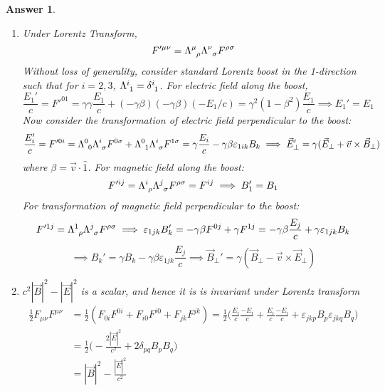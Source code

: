 \documentclass[a4paper]{article}
\theoremstyle{new2}
\newtheorem{ans}{Answer}[section]
\theoremstyle{new}
\begin{document}
\begin{ans}
\begin{enumerate}[label=(\alph*)]
$$\partial_0F_{ij}=-\frac{\partial}{\partial ct}\varepsilon_{ijk}B_k,\quad\partial_jF_{0i}=\partial_j\frac{E_i}{c},\quad\partial_iF_{j0}=-\partial_i\frac{E_j}{c}$$
$$\implies-\partial_iE_j+\partial_jE_i=-\varepsilon_{ijk}\varepsilon_{pqk}\partial_pE_q\implies\frac{\partial\vec{B}}{\partial t}=-\vec{\nabla}\times\vec{E}$$
\item Under Lorentz Transform,
$$F'^{\mu\nu}=\tensor*{\Lambda}{*_{}^{\mu}_{\rho}}\tensor*{\Lambda}{*_{}^{\nu}_{\sigma}} F^{\rho\sigma}$$
Without loss of generality, consider standard Lorentz boost in the 1-direction such that for $i=2,3$,  $\tensor*{\Lambda}{*_{}^{i}_{1}}=\tensor*{\delta}{*_{}^{i}_{1}}$. For electric field along the boost,
$$\frac{E_1'}{c}=F'^{01}=\gamma\gamma\frac{E_1}{c}+(-\gamma\beta)(-\gamma\beta)(-E_1/c)=\gamma^2(1-\beta^2)\frac{E_1}{c}\implies E_1'=E_1$$
Now consider the transformation of electric field perpendicular to the boost:
$$\frac{E_i'}{c}=F'^{0i}=\tensor*{\Lambda}{*_{}^{0}_{0}}\tensor*{\Lambda}{*_{}^{i}_{\sigma}}F^{0\sigma}+\tensor*{\Lambda}{*_{}^{0}_{1}}\tensor*{\Lambda}{*_{}^{i}_{\sigma}}F^{1\sigma}=\gamma\frac{E_i}{c}-\gamma\beta\varepsilon_{1ik}B_k\implies\vec{E}'_\perp=\gamma(\vec{E}_\perp+\vec{v}\times\vec{B}_\perp)$$
where $\beta=\vec{v}\cdot\hat{1}$. For magnetic field along the boost:
$$F'^{ij}=\tensor*{\Lambda}{*_{}^{i}_{\rho}}\tensor*{\Lambda}{*_{}^{j}_{\sigma}}F^{\rho\sigma}=F^{ij}\implies B_1'=B_1$$
For transformation of magnetic field perpendicular to the boost:
$$F'^{1j}=\tensor*{\Lambda}{*_{}^{1}_{\rho}}\tensor*{\Lambda}{*_{}^{j}_{\sigma}}F^{\rho\sigma}\implies\varepsilon_{1jk}B_k'=-\gamma\beta F^{0j}+\gamma F^{1j}=-\gamma\beta\frac{E_j}{c}+\gamma\varepsilon_{1jk}B_k$$
$$\implies B_k'=\gamma B_k-\gamma\beta\varepsilon_{1jk}\frac{E_j}{c}\implies \vec{B}_\perp'=\gamma(\vec{B}_\perp-\vec{v}\times\vec{E}_\perp)$$
\item $c^2|\vec{B}|^2-|\vec{E}|^2$ is a scalar, and hence it is is invariant under Lorentz transform
\begin{align}
\frac{1}{2}F_{\mu\nu}F^{\mu\nu}&=\frac{1}{2}(F_{0i}F^{0i}+F_{i0}F^{i0}+F_{jk}F^{jk})=\frac{1}{2}\bigg(\frac{E_i}{c}\frac{-E_i}{c}+\frac{E_i}{c}\frac{-E_i}{c}+\varepsilon_{jkp}B_p\varepsilon_{jkq}B_q\bigg)\nonumber\\&=\frac{1}{2}\bigg(-\frac{2|\vec{E}|^2}{c^2}+2\delta_{pq}B_pB_q\bigg)\nonumber\\&=|\vec{B}|^2-\frac{|\vec{E}|^2}{c^2}\nonumber
\end{align}
\end{enumerate}
\end{ans}
\end{document}
